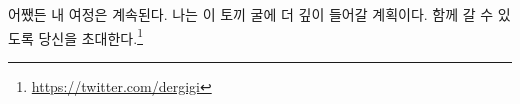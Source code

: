 \begin{comment}
	In any case, my journey continues. I plan to venture further down into the
	depths of this rabbit hole, and I invite you to tag
	along for the ride.\footnote{\url{https://twitter.com/dergigi}}
\end{comment}
어쨌든 내 여정은 계속된다. 나는 이 토끼 굴에 더 깊이 들어갈 계획이다.
함께 갈 수 있도록 당신을 초대한다.\footnote{\url{https://twitter.com/dergigi}}

%
